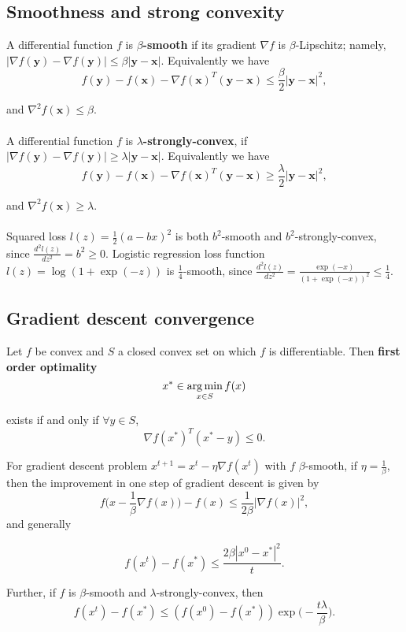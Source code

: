 \documentclass[../main.tex]{subfiles}
\begin{document}
\setlength{\parindent}{0pt}

\subsection{Smoothness and strong convexity}
A differential function $f$ is \textbf{$\beta$-smooth} if its gradient $\nabla f$ is $\beta$-Lipschitz; namely, $|\nabla f(\textbf{y})-\nabla f(\textbf{y})|\leq \beta|\textbf{y}-\textbf{x}|$. Equivalently we have $$f(\textbf{y})-f(\textbf{x})-\nabla f(\textbf{x})^T(\textbf{y}-\textbf{x})\leq \frac{\beta}{2}|\textbf{y}-\textbf{x}|^2,$$

and $\nabla^2f(\textbf{x})\leq \beta$.\\
\\
A differential function $f$ is \textbf{$\lambda$-strongly-convex}, if $|\nabla f(\textbf{y})-\nabla f(\textbf{y})|\geq \lambda|\textbf{y}-\textbf{x}|$. Equivalently we have 
$$f(\textbf{y})-f(\textbf{x})-\nabla f(\textbf{x})^T(\textbf{y}-\textbf{x})\geq \frac{\lambda}{2}|\textbf{y}-\textbf{x}|^2,$$

and $\nabla^2f(\textbf{x})\geq \lambda$.\\
\\
Squared loss $l(z)=\frac{1}{2}(a-bx)^2$ is both $b^2$-smooth and $b^2$-strongly-convex, since $\frac{d^2l(z)}{dz^2}=b^2\geq 0$. Logistic regression loss function $l(z)=\log (1+\exp{(-z)})$ is $\frac{1}{4}$-smooth, since $\frac{d^2l(z)}{dz^2}=\frac{\exp{(-x)}}{(1+\exp{(-x)})^2}\leq \frac{1}{4}$.
\subsection{Gradient descent convergence}
Let $f$ be convex and $S$ a closed convex set on which $f$ is differentiable. Then \textbf{first order optimality} $$x^*\in \operatorname*{arg\,min}_{x\in S}f(x)$$ 

exists if and only if $\forall y\in S$, $$\nabla f(x^*)^T(x^*-y)\leq 0.$$

For gradient descent problem $x^{t+1}=x^t-\eta\nabla f(x^t)$ with $f$ $\beta$-smooth, if $\eta=\frac{1}{\beta}$, then the improvement in one step of gradient descent is given by $$f\bigg( x-\frac{1}{\beta}\nabla f(x)\bigg)-f(x)\leq \frac{1}{2\beta}|\nabla f(x)|^2,$$ and generally

$$f(x^t)-f(x^*)\leq \frac{2\beta|x^0-x^*|^2}{t}.$$

Further, if $f$ is $\beta$-smooth and $\lambda$-strongly-convex, then $$f(x^t)-f(x^*)\leq (f(x^0)-f(x^*))\exp{\big(-\frac{t\lambda}{\beta}\big)}.$$
\end{document}
